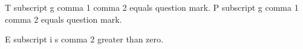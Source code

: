 T subscript g comma 1 comma 2 equals question mark. P subscript g comma 1 comma 2 equals question mark.

E subscript i s comma 2 greater than zero.
